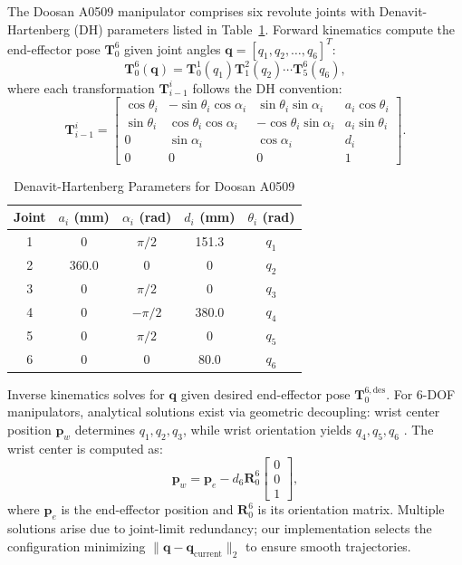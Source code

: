 \documentclass[journal]{IEEEtran}
\begin{document}
The Doosan A0509 manipulator comprises six revolute joints with Denavit-Hartenberg (DH) parameters listed in Table~\ref{tab:dh_params}. Forward kinematics compute the end-effector pose $\mathbf{T}_{0}^{6}$ given joint angles $\boldsymbol{q} = [q_1, q_2, \ldots, q_6]^T$:
\begin{equation}
\mathbf{T}_{0}^{6}(\boldsymbol{q}) = \mathbf{T}_{0}^{1}(q_1) \mathbf{T}_{1}^{2}(q_2) \cdots \mathbf{T}_{5}^{6}(q_6),
\label{eq:forward_kinematics}
\end{equation}
where each transformation $\mathbf{T}_{i-1}^{i}$ follows the DH convention:
\begin{equation}
\mathbf{T}_{i-1}^{i} = 
\begin{bmatrix}
\cos\theta_i & -\sin\theta_i \cos\alpha_i & \sin\theta_i \sin\alpha_i & a_i \cos\theta_i \\
\sin\theta_i & \cos\theta_i \cos\alpha_i & -\cos\theta_i \sin\alpha_i & a_i \sin\theta_i \\
0 & \sin\alpha_i & \cos\alpha_i & d_i \\
0 & 0 & 0 & 1
\end{bmatrix}.
\label{eq:dh_transform}
\end{equation}

\begin{table}[t]
\caption{Denavit-Hartenberg Parameters for Doosan A0509}
\label{tab:dh_params}
\centering
\begin{tabular}{ccccc}
\hline
Joint & $a_i$ (mm) & $\alpha_i$ (rad) & $d_i$ (mm) & $\theta_i$ (rad) \\
\hline
1 & 0 & $\pi/2$ & 151.3 & $q_1$ \\
2 & 360.0 & 0 & 0 & $q_2$ \\
3 & 0 & $\pi/2$ & 0 & $q_3$ \\
4 & 0 & $-\pi/2$ & 380.0 & $q_4$ \\
5 & 0 & $\pi/2$ & 0 & $q_5$ \\
6 & 0 & 0 & 80.0 & $q_6$ \\
\hline
\end{tabular}
\end{table}

Inverse kinematics solves for $\boldsymbol{q}$ given desired end-effector pose $\mathbf{T}_{0}^{6,\text{des}}$. For 6-DOF manipulators, analytical solutions exist via geometric decoupling: wrist center position $\boldsymbol{p}_w$ determines $q_1, q_2, q_3$, while wrist orientation yields $q_4, q_5, q_6$ \cite{craig2005introduction}. The wrist center is computed as:
\begin{equation}
\boldsymbol{p}_w = \boldsymbol{p}_e - d_6 \mathbf{R}_{0}^{6} \begin{bmatrix} 0 \\ 0 \\ 1 \end{bmatrix},
\label{eq:wrist_center}
\end{equation}
where $\boldsymbol{p}_e$ is the end-effector position and $\mathbf{R}_{0}^{6}$ is its orientation matrix. Multiple solutions arise due to joint-limit redundancy; our implementation selects the configuration minimizing $\|\boldsymbol{q} - \boldsymbol{q}_{\text{current}}\|_2$ to ensure smooth trajectories.
\end{document}
